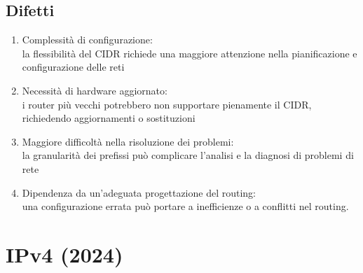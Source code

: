 \documentclass[10pt,oneside,a4paper]{article}
\begin{document}
\subsection{Difetti}
\begin{enumerate}
\item Complessità di configurazione:\\
la flessibilità del CIDR richiede una maggiore attenzione nella pianificazione e configurazione delle reti
\item Necessità di hardware aggiornato:\\
i router più vecchi potrebbero non supportare pienamente il CIDR, richiedendo aggiornamenti o sostituzioni
\item Maggiore difficoltà nella risoluzione dei problemi:\\
la granularità dei prefissi può complicare l'analisi e la diagnosi di problemi di rete
\item Dipendenza da un'adeguata progettazione del routing:\\
una configurazione errata può portare a inefficienze o a conflitti nel routing.
\end{enumerate}
\section{IPv4 (2024)}
\end{document}
